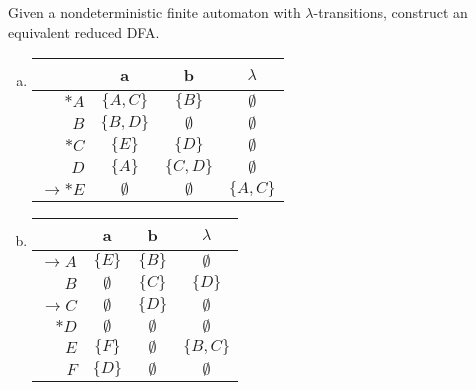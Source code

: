 \documentclass[a4paper,12pt]{amsart}
\begin{document}
\medskip\begin{problem}

    Given a nondeterministic finite automaton with  $\lambda$-transitions, construct an equivalent reduced DFA.
    
    
    \begin{multicols}{2}
    
        \begin{enumerate}[(a)]

            \item \begin{tabular}{ r | c c c }
            & a & b & $\lambda$ \\ \hline
            $\ast A$ & $\{A,C\}$ & $\{B\}$ & $\emptyset$ \\
            $B$ & $\{B,D\}$ & $\emptyset$ & $\emptyset$ \\
            $\ast C$ & $\{E\}$ & $\{D\}$ & $\emptyset$ \\
            $D$ & $\{A\}$ & $\{C,D\}$ & $\emptyset$ \\
            $\to\ast E$ & $\emptyset$ & $\emptyset$ & $\{A,C\}$
            \end{tabular}
            
            \item \begin{tabular}{ r | c c c }
            & a & b & $\lambda$ \\ \hline
            $\to A$ & $\{E\}$ & $\{B\}$ & $\emptyset$ \\
            $B$ & $\emptyset$ & $\{C\}$ & $\{D\}$ \\
            $\to C$ & $\emptyset$ & $\{D\}$ & $\emptyset$ \\
            $\ast D$ & $\emptyset$ & $\emptyset$ & $\emptyset$ \\
            $E$ & $\{F\}$ & $\emptyset$ & $\{B,C\}$\\
            $F$ & $\{D\}$ & $\emptyset$ & $\emptyset$
            \end{tabular}
    
        \end{enumerate}
    
    \end{multicols}

\end{problem}
\end{document}
